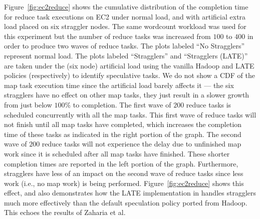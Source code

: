 % 

Figure~\ref{fig:ec2reduce} shows the cumulative distribution of the
completion time for reduce task executions on EC2 under normal load,
and with artificial extra load placed on six straggler nodes.  The
same wordcount workload was used for this experiment but the number of
reduce tasks was increased from $100$ to $400$ in order to produce two
waves of reduce tasks.  The plots labeled ``No Stragglers'' represent
normal load.  The plots labeled ``Stragglers'' and ``Stragglers
(LATE)'' are taken under the (six node) artificial load using the
vanilla Hadoop and LATE policies (respectively) to identify
speculative tasks.  We do not show a CDF of the map task execution
time since the artificial load barely affects it --- the six
stragglers have no effect on other map tasks, they just result in a
slower growth from just below $100\%$ to completion.
The first wave of $200$ reduce tasks is scheduled concurrently with
all the map tasks. This first wave of reduce tasks will not finish
until all map tasks have completed, which increases the completion time
of these tasks as indicated in the right portion of the graph. The
second wave of $200$ reduce tasks will not experience the delay due to
unfinished map work since it is scheduled after all map tasks have
finished. These shorter completion times are reported in the left
portion of the graph. Furthermore, stragglers have less of an impact
on the second wave of reduce tasks since less work (i.e., no map work)
is being performed. Figure~\ref{fig:ec2reduce} shows this effect, and
also demonstrates how the LATE implementation in \BOOMA handles
stragglers much more effectively than the default speculation policy
ported from Hadoop.  This echoes the results of Zaharia et
al.~\cite{late-sched}

